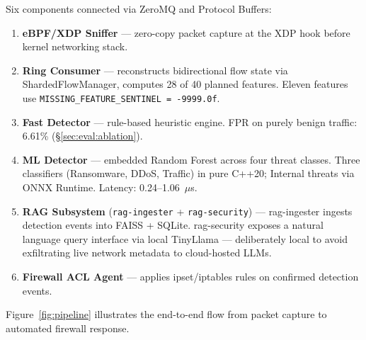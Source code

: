 \documentclass[11pt,a4paper]{article}
\begin{document}
    Six components connected via ZeroMQ and Protocol Buffers:

    \begin{enumerate}
        \item \textbf{eBPF/XDP Sniffer} --- zero-copy packet capture at the XDP hook before kernel
        networking stack.
        \item \textbf{Ring Consumer} --- reconstructs bidirectional flow state via
        ShardedFlowManager, computes 28 of 40 planned features. Eleven features use
        \texttt{MISSING\_FEATURE\_SENTINEL = -9999.0f}.
        \item \textbf{Fast Detector} --- rule-based heuristic engine. FPR on purely benign traffic:
        6.61\% (\S\ref{sec:eval:ablation}).
        \item \textbf{ML Detector} --- embedded Random Forest across four threat classes. Three
        classifiers (Ransomware, DDoS, Traffic) in pure C++20; Internal threats via ONNX Runtime.
        Latency: 0.24--1.06~$\mu$s.
        \item \textbf{RAG Subsystem} (\texttt{rag-ingester} + \texttt{rag-security}) ---
        rag-ingester ingests detection events into FAISS + SQLite. rag-security exposes a natural
        language query interface via local TinyLlama --- deliberately local to avoid exfiltrating
        live network metadata to cloud-hosted LLMs.
        \item \textbf{Firewall ACL Agent} --- applies ipset/iptables rules on confirmed detection
        events.
    \end{enumerate}

    Figure~\ref{fig:pipeline} illustrates the end-to-end flow from packet capture to
    automated firewall response.
\end{document}
